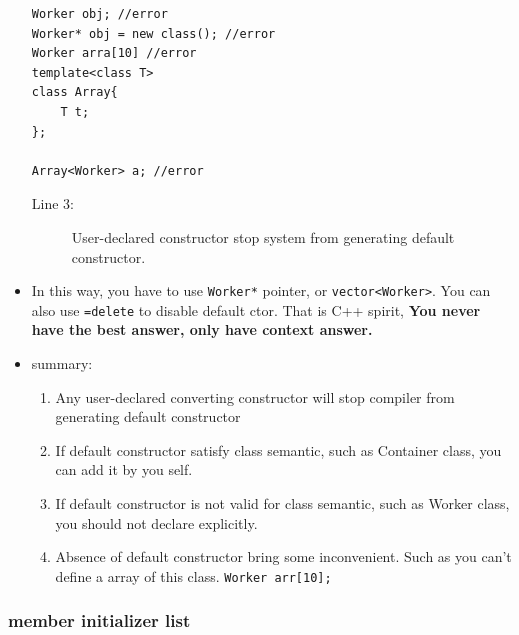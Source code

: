 \documentclass[a4paper,11pt,twoside]{book}
\begin{document}
\begin{itemize}
\begin{lstlisting}
Worker obj; //error
Worker* obj = new class(); //error
Worker arra[10] //error
template<class T>
class Array{
	T t;
};

Array<Worker> a; //error
\end{lstlisting}
\begin{description}
	\item[Line 3:] User-declared constructor stop system from generating default constructor.
\end{description}

	
\item In this way, you have to use \texttt{Worker*} pointer, or \texttt{vector<Worker>}.  You can also use \texttt{=delete} to disable default ctor. That is C++ spirit, \textbf{You never have the best answer, only have context answer. }

\item summary:
\begin{enumerate}
	\item Any user-declared converting constructor will stop compiler from generating default constructor
	\item If default constructor satisfy class semantic, such as Container class, you can add it by you self.
	\item If default constructor is not valid for class semantic, such as Worker class, you should not declare explicitly. 
	\item Absence of default constructor bring some inconvenient. Such as you can't define a array of this class. \texttt{Worker arr[10];} 
\end{enumerate}
	
	
\end{itemize}

\subsubsection{member initializer list}
\end{document}
